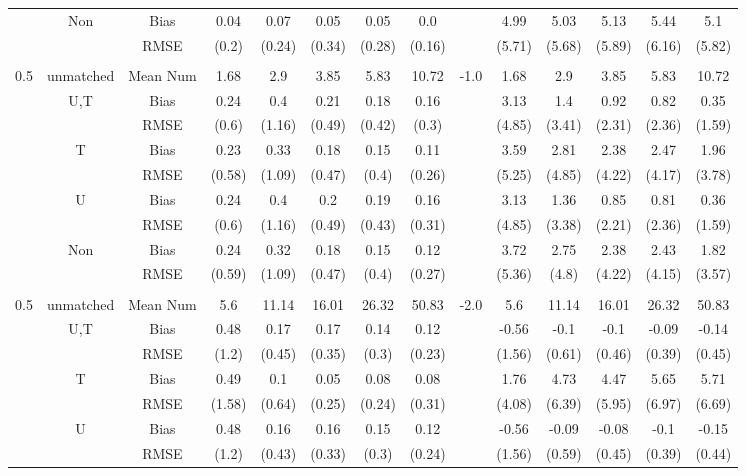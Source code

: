 \begin{tabular}{@{\extracolsep{5pt}}lc|cccccc|lccccc}
 & Non & Bias & 0.04 & 0.07 & 0.05 & 0.05 & 0.0 &  & 4.99 & 5.03 & 5.13 & 5.44 & 5.1 \\
 &  & RMSE & (0.2) & (0.24) & (0.34) & (0.28) & (0.16) &  & (5.71) & (5.68) & (5.89) & (6.16) & (5.82) \\
 &  &  &  &  &  &  &  &  &  &  &  &  &  \\
0.5 & unmatched & Mean Num & 1.68 & 2.9 & 3.85 & 5.83 & 10.72 & -1.0 & 1.68 & 2.9 & 3.85 & 5.83 & 10.72 \\
 & U,T & Bias & 0.24 & 0.4 & 0.21 & 0.18 & 0.16 &  & 3.13 & 1.4 & 0.92 & 0.82 & 0.35 \\
 &  & RMSE & (0.6) & (1.16) & (0.49) & (0.42) & (0.3) &  & (4.85) & (3.41) & (2.31) & (2.36) & (1.59) \\
 & T & Bias & 0.23 & 0.33 & 0.18 & 0.15 & 0.11 &  & 3.59 & 2.81 & 2.38 & 2.47 & 1.96 \\
 &  & RMSE & (0.58) & (1.09) & (0.47) & (0.4) & (0.26) &  & (5.25) & (4.85) & (4.22) & (4.17) & (3.78) \\
 & U & Bias & 0.24 & 0.4 & 0.2 & 0.19 & 0.16 &  & 3.13 & 1.36 & 0.85 & 0.81 & 0.36 \\
 &  & RMSE & (0.6) & (1.16) & (0.49) & (0.43) & (0.31) &  & (4.85) & (3.38) & (2.21) & (2.36) & (1.59) \\
 & Non & Bias & 0.24 & 0.32 & 0.18 & 0.15 & 0.12 &  & 3.72 & 2.75 & 2.38 & 2.43 & 1.82 \\
 &  & RMSE & (0.59) & (1.09) & (0.47) & (0.4) & (0.27) &  & (5.36) & (4.8) & (4.22) & (4.15) & (3.57) \\
 &  &  &  &  &  &  &  &  &  &  &  &  &  \\
0.5 & unmatched & Mean Num & 5.6 & 11.14 & 16.01 & 26.32 & 50.83 & -2.0 & 5.6 & 11.14 & 16.01 & 26.32 & 50.83 \\
 & U,T & Bias & 0.48 & 0.17 & 0.17 & 0.14 & 0.12 &  & -0.56 & -0.1 & -0.1 & -0.09 & -0.14 \\
 &  & RMSE & (1.2) & (0.45) & (0.35) & (0.3) & (0.23) &  & (1.56) & (0.61) & (0.46) & (0.39) & (0.45) \\
 & T & Bias & 0.49 & 0.1 & 0.05 & 0.08 & 0.08 &  & 1.76 & 4.73 & 4.47 & 5.65 & 5.71 \\
 &  & RMSE & (1.58) & (0.64) & (0.25) & (0.24) & (0.31) &  & (4.08) & (6.39) & (5.95) & (6.97) & (6.69) \\
 & U & Bias & 0.48 & 0.16 & 0.16 & 0.15 & 0.12 &  & -0.56 & -0.09 & -0.08 & -0.1 & -0.15 \\
 &  & RMSE & (1.2) & (0.43) & (0.33) & (0.3) & (0.24) &  & (1.56) & (0.59) & (0.45) & (0.39) & (0.44) \\

\end{tabular}
